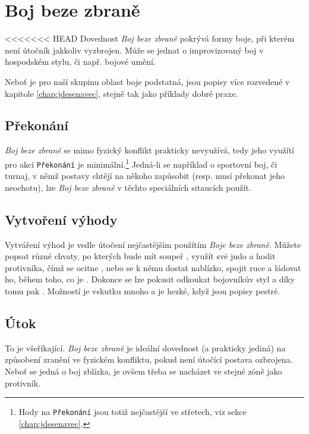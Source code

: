 \documentclass[../main.tex]{subfiles}
\begin{document}
\section{Boj beze zbraně}
\label{sec:bojbezezbrane}

<<<<<<< HEAD
Dovednost \textit{Boj beze zbraně} pokrývá formy boje, při kterém není útočník jakkoliv vyzbrojen. Může se jednat o improvizovaný boj v hospodském stylu, či např. bojové umění.

Neboť je pro naší skupinu oblast boje podstatná, jsou popisy více rozvedené v kapitole \ref{chap:jdesenavec}, stejně tak jako příklady dobré praxe.

\subsection*{Překonání}
\label{subsec:boj-prekonani}
\prekonani

\textit{Boj beze zbraně} se mimo fyzický konflikt prakticky nevyužívá, tedy jeho využítí pro akci \texttt{Překonání} je minimální.\footnote{Hody na \texttt{Překonání} jsou totiž nejčastější ve střetech, viz sekce \ref{chap:jdesenavec}.} Jedná-li se například o sportovní boj, či turnaj, v němž postavy chtějí na někoho zapůsobit (resp. musí překonat jeho neochotu), lze \textit{Boj beze zbraně} v těchto speciálních sitaucích použít.

\subsection*{Vytvoření výhody}
\label{subsec:boj-vytvoreni}
\vytvoreni

Vytváření výhod je vedle útočení nejčastějším použítím \textit{Boje beze zbraně}. Můžete popsat různé chvaty, po kterých bude mít soupeř , využít své judo a hodit protivníka, čímž se ocitne , nebo se k němu dostat nablízko, spojit ruce a ládovat ho, během toho, co je . Dokonce se lze pokusit odkoukat bojovníkův styl a díky tomu pak . Možností je vskutku mnoho a je hezké, když jsou popisy pestré.


\subsection*{Útok}
\label{subsec:boj-utok}
\utok

To je všeříkající. \textit{Boj beze zbraně} je ideální dovednost (a prakticky jediná) na způsobení zranění ve fyzickém konfliktu, pokud není útočící postava ozbrojena. Neboť se jedná o boj zblízka, je ovšem třeba se nacházet ve stejné zóně jako protivník.
\end{document}
